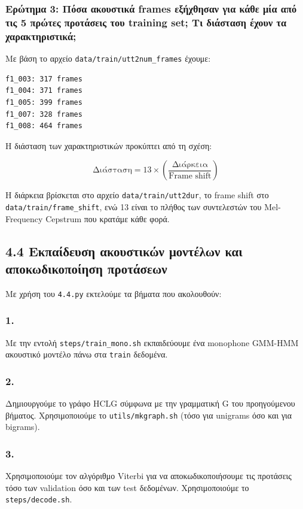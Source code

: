 \documentclass[a4paper, 12pt]{article}
\begin{document}
        \subsubsection*{Ερώτημα 3: Πόσα ακουστικά frames εξήχθησαν για κάθε μία από τις 5 πρώτες προτάσεις του training set; Τι διάσταση έχουν τα χαρακτηριστικά;}
        
        
        Με βάση το αρχείο \verb|data/train/utt2num_frames| έχουμε:
        
        \begin{verbatim}
f1_003: 317 frames
f1_004: 371 frames
f1_005: 399 frames
f1_007: 328 frames
f1_008: 464 frames
        \end{verbatim}
        
        Η διάσταση των χαρακτηριστικών προκύπτει από τη σχέση:
        
        \[
            \text{Διάσταση} = 13 \times \left( \frac{\text{Διάρκεια}}{\text{Frame shift}} \right)
        \]
        
        Η διάρκεια βρίσκεται στο αρχείο \verb|data/train/utt2dur|, το frame shift στο \verb|data/train/frame_shift|, ενώ 13 είναι το πλήθος των συντελεστών του Mel-Frequency Cepstrum που κρατάμε κάθε φορά.
        
    \subsection*{4.4 Εκπαίδευση ακουστικών μοντέλων και αποκωδικοποίηση προτάσεων}
        
        Με χρήση του \verb|4.4.py| εκτελούμε τα βήματα που ακολουθούν:
    
        \subsubsection*{1.}
            Με την εντολή \verb|steps/train_mono.sh| εκπαιδεύουμε ένα monophone GMM-HMM ακουστικό μοντέλο πάνω στα \verb|train| δεδομένα.
        
        \subsubsection*{2.}
            Δημιουργούμε το γράφο HCLG σύμφωνα με την γραμματική G του προηγούμενου βήματος. Χρησιμοποιούμε το \verb|utils/mkgraph.sh| (τόσο για unigrams όσο και για bigrams).
            
        \subsubsection*{3.}
            Χρησιμοποιούμε τον αλγόριθμο Viterbi για να αποκωδικοποιήσουμε τις προτάσεις τόσο των validation όσο και των test δεδομένων. Χρησιμοποιούμε το \verb|steps/decode.sh|.
        
\end{document}
